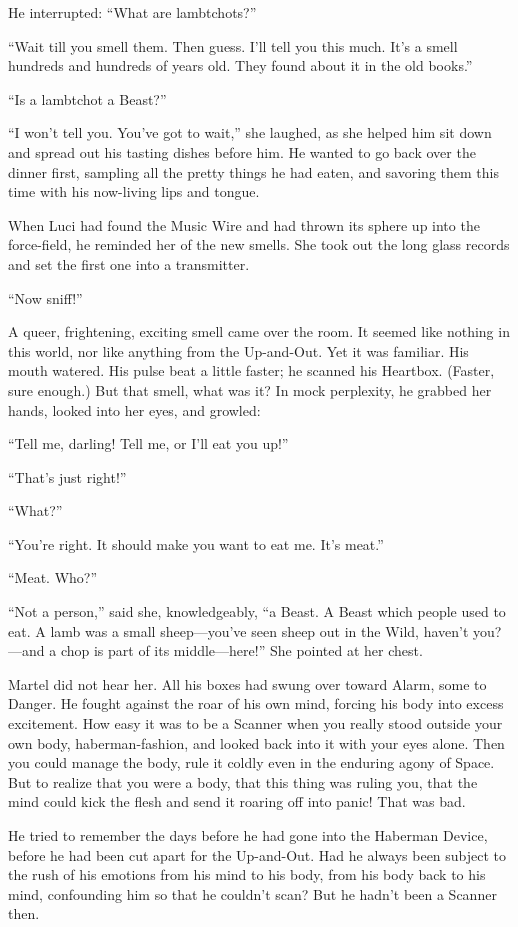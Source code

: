 He interrupted: ``What are lambtchots?''

``Wait till you smell them. Then guess. I'll tell you this much. It's a smell hundreds and hundreds of years old. They found about it in the old books.''

``Is a lambtchot a Beast?''

``I won't tell you. You've got to wait,'' she laughed, as she helped him sit down and spread out his tasting dishes before him. He wanted to go back over the dinner first, sampling all the pretty things he had eaten, and savoring them this time with his now-living lips and tongue.

When Luci had found the Music Wire and had thrown its sphere up into the force-field, he reminded her of the new smells. She took out the long glass records and set the first one into a transmitter.

``Now sniff!''

A queer, frightening, exciting smell came over the room. It seemed like nothing in this world, nor like anything from the Up-and-Out. Yet it was familiar. His mouth watered. His pulse beat a little faster; he scanned his Heartbox. (Faster, sure enough.) But that smell, what was it? In mock perplexity, he grabbed her hands, looked into her eyes, and growled:

``Tell me, darling! Tell me, or I'll eat you up!''

``That's just right!''

``What?''

``You're right. It should make you want to eat me. It's meat.''

``Meat. Who?''

``Not a person,'' said she, knowledgeably, ``a Beast. A Beast which people used to eat. A lamb was a small sheep---you've seen sheep out in the Wild, haven't you?---and a chop is part of its middle---here!'' She pointed at her chest.

Martel did not hear her. All his boxes had swung over toward Alarm, some to Danger. He fought against the roar of his own mind, forcing his body into excess excitement. How easy it was to be a Scanner when you really stood outside your own body, haberman-fashion, and looked back into it with your eyes alone. Then you could manage the body, rule it coldly even in the enduring agony of Space. But to realize that you were a body, that this thing was ruling you, that the mind could kick the flesh and send it roaring off into panic! That was bad.

He tried to remember the days before he had gone into the Haberman Device, before he had been cut apart for the Up-and-Out. Had he always been subject to the rush of his emotions from his mind to his body, from his body back to his mind, confounding him so that he couldn't scan? But he hadn't been a Scanner then.

